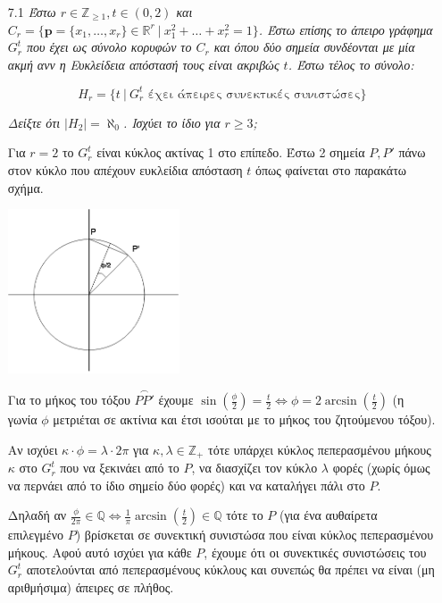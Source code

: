 \documentclass[a4paper, oneside, 11pt]{article}
\theoremstyle{definition}
\begin{document}
\begin{enumerate}
   \item[7.1] \emph{Έστω $r \in \mathbb{Z}_{\geq 1}, t \in (0, 2)$
   και $C_r = \{ \mathbf{p} = \{x_1, \ldots, x_r\} \in \mathbb{R}^r\ |\ 
   x_1^2 + \ldots +x_r^2 = 1 \}$. Έστω επίσης το άπειρο γράφημα
   $G_r^t$ που έχει ως σύνολο κορυφών το $C_r$ και όπου δύο σημεία
   συνδέονται με μία ακμή ανν η Ευκλείδεια απόστασή τους είναι
   ακριβώς $t$. Έστω τέλος το σύνολο:}

   \[ H_r = \{ t\ |\ G_r^t \text{ έχει άπειρες συνεκτικές συνιστώσες} \} \]

   \emph{Δείξτε ότι $|H_2| = \aleph_0$. Ισχύει το ίδιο για $r \geq 3$;}
   \newline

   Για $r=2$ το $G_r^t$ είναι κύκλος ακτίνας 1 στο επίπεδο. Έστω
   2 σημεία $P, P'$ πάνω στον κύκλο που απέχουν ευκλείδια απόσταση $t$
   όπως φαίνεται στο παρακάτω σχήμα.

   \begin{center}
      \includegraphics[width=0.4\textwidth]{./pics/geom.png}
   \end{center}

   Για το μήκος του τόξου $\stackrel\frown{PP'}$ έχουμε
   $\sin \left( \frac{\phi}{2} \right) = \frac{t}{2}
   \Leftrightarrow \phi = 2 \arcsin \left( \frac{t}{2} \right)$
   (η γωνία $\phi$ μετριέται σε ακτίνια και έτσι ισούται με το
   μήκος του ζητούμενου τόξου).

   Αν ισχύει $\kappa \cdot \phi = \lambda \cdot 2\pi$ 
   για $\kappa, \lambda \in \mathbb{Z}_+$ τότε υπάρχει
   κύκλος πεπερασμένου μήκους $\kappa$ στο $G_r^t$ που να ξεκινάει από το
   $P$, να διασχίζει τον κύκλο $\lambda$ φορές (χωρίς όμως να περνάει
   από το ίδιο σημείο δύο φορές) και να καταλήγει πάλι στο $P$.

   Δηλαδή αν $\frac{\phi}{2\pi} \in \mathbb{Q} \Leftrightarrow
   \frac{1}{\pi} \arcsin \left( \frac{t}{2} \right) \in \mathbb{Q}$
   τότε το $P$ (για ένα αυθαίρετα επιλεγμένο $P$) βρίσκεται σε συνεκτική
   συνιστώσα που είναι κύκλος πεπερασμένου μήκους. Αφού αυτό
   ισχύει για κάθε $P$, έχουμε ότι οι συνεκτικές συνιστώσεις του $G_r^t$
   αποτελούνται από πεπερασμένους κύκλους και συνεπώς θα πρέπει
   να είναι (μη αριθμήσιμα) άπειρες σε πλήθος.


\end{enumerate}
\end{document}
